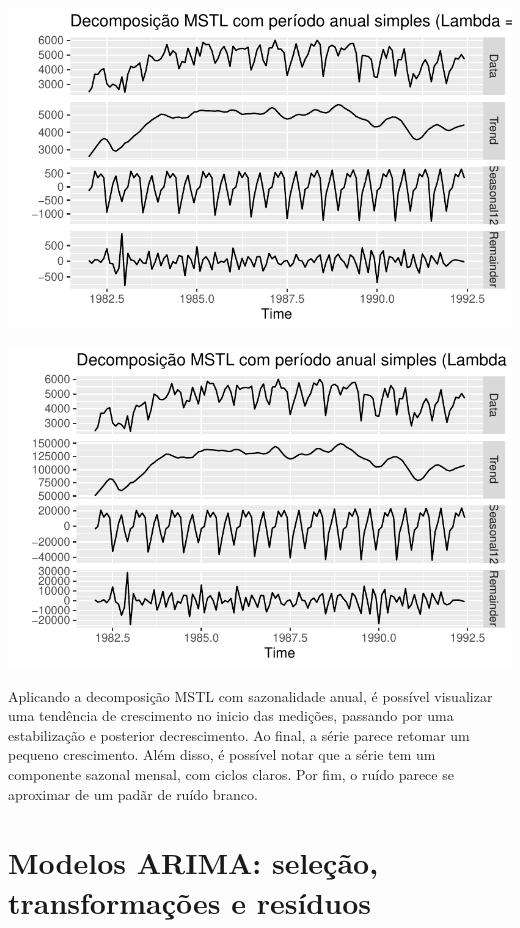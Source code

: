 \documentclass[
  letterpaper,
  DIV=11,
  numbers=noendperiod]{scrartcl}
\begin{document}
\includegraphics{T2_grupo10_files/figure-pdf/decomposicao-mstl-1.pdf}

\includegraphics{T2_grupo10_files/figure-pdf/decomposicao-mstl-2.pdf}

Aplicando a decomposição MSTL com sazonalidade anual, é possível
visualizar uma tendência de crescimento no inicio das medições, passando
por uma estabilização e posterior decrescimento. Ao final, a série
parece retomar um pequeno crescimento. Além disso, é possível notar que
a série tem um componente sazonal mensal, com ciclos claros. Por fim, o
ruído parece se aproximar de um padãr de ruído branco.

\hypertarget{modelos-arima-seleuxe7uxe3o-transformauxe7uxf5es-e-resuxedduos}{%
\section{Modelos ARIMA: seleção, transformações e
resíduos}\label{modelos-arima-seleuxe7uxe3o-transformauxe7uxf5es-e-resuxedduos}}
\end{document}
